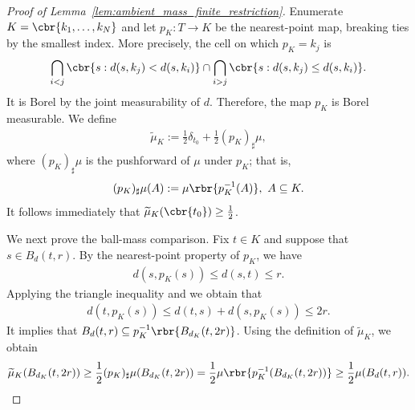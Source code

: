 \documentclass[11pt]{article}
\begin{document}
\begin{proof}[Proof of Lemma~\ref{lem:ambient_mass_finite_restriction}]
Enumerate $K=\cbr{k_1,\ldots,k_N}$ and let $p_K:T\to K$ be the
nearest-point map, breaking ties by the smallest index. More precisely,
the cell on which $p_K=k_j$ is
\begin{align*}
\bigcap_{i<j}\cbr{s:d(s,k_j)<d(s,k_i)}
\cap
\bigcap_{i>j}\cbr{s:d(s,k_j)\le d(s,k_i)}.
\end{align*}
It is Borel by the joint measurability of $d$. Therefore, the map
$p_K$ is Borel measurable. We define
\begin{align*}
\widetilde\mu_K
:=
\frac12\delta_{t_0}
+
\frac12(p_K)_\sharp\mu,
\end{align*}
where $(p_K)_\sharp\mu$ is the pushforward of $\mu$ under $p_K$;
that is,
\begin{align*}
(p_K)_\sharp\mu(A)
:=
\mu\rbr{p_K^{-1}(A)},
\ A\subseteq K.
\end{align*}
It follows immediately that $\widetilde\mu_K(\cbr{t_0})\ge\frac12$.

We next prove the ball-mass comparison. Fix $t\in K$ and suppose that
$s\in B_d(t,r)$. By the nearest-point property of $p_K$, we have
\begin{align*}
d(s,p_K(s))
\le
d(s,t)
\le
r.
\end{align*}
Applying the triangle inequality and we obtain that
\begin{align*}
d(t,p_K(s))
\le
d(t,s)+d(s,p_K(s))
\le
2r.
\end{align*}
It implies that $B_d(t,r)
\subseteq
p_K^{-1}\rbr{B_{d_K}(t,2r)}$.
Using the definition of $\widetilde\mu_K$, we obtain
\begin{align*}
\widetilde\mu_K(B_{d_K}(t,2r))\ge
\frac12(p_K)_\sharp\mu(B_{d_K}(t,2r))=
\frac12\mu\rbr{p_K^{-1}(B_{d_K}(t,2r))}\ge
\frac12\mu(B_d(t,r)).
\end{align*}


\end{proof}
\end{document}
